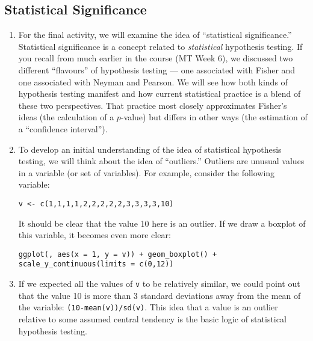 \documentclass[a4paper,12pt]{article}
\begin{document}
\subsection{Statistical Significance}

\begin{enumerate}

\item For the final activity, we will examine the idea of ``statistical significance.'' Statistical significance is a concept related to \textit{statistical} hypothesis testing. If you recall from much earlier in the course (MT Week 6), we discussed two different ``flavours'' of hypothesis testing --- one associated with Fisher and one associated with Neyman and Pearson. We will see how both kinds of hypothesis testing manifest and how current statistical practice is a blend of these two perspectives. That practice most closely approximates Fisher's ideas (the calculation of a $p$-value) but differs in other ways (the estimation of a ``confidence interval'').

\item To develop an initial understanding of the idea of statistical hypothesis testing, we will think about the idea of ``outliers.'' Outliers are unusual values in a variable (or set of variables). For example, consider the following variable:

\begin{verbatim}
v <- c(1,1,1,1,2,2,2,2,2,3,3,3,3,10)
\end{verbatim}

\noindent It should be clear that the value 10 here is an outlier. If we draw a boxplot of this variable, it becomes even more clear:

\begin{verbatim}
ggplot(, aes(x = 1, y = v)) + geom_boxplot() + scale_y_continuous(limits = c(0,12))
\end{verbatim}

\item If we expected all the values of \texttt{v} to be relatively similar, we could point out that the value 10 is more than 3 standard deviations away from the mean of the variable: \texttt{(10-mean(v))/sd(v)}. This idea that a value is an outlier relative to some assumed central tendency is the basic logic of statistical hypothesis testing.


\end{enumerate}
\end{document}
